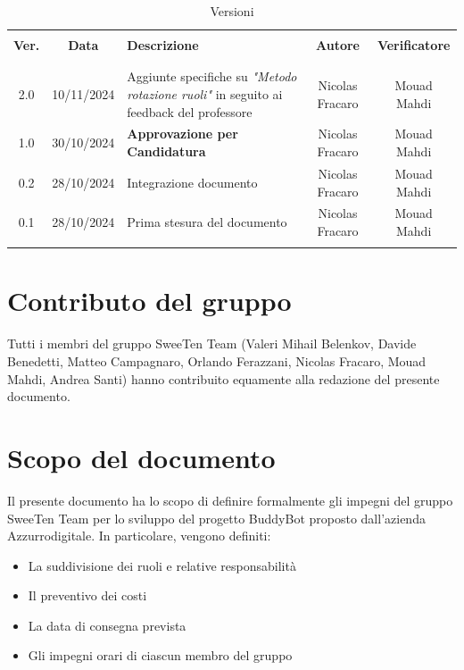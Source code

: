 \documentclass[italian, 12pt]{article}
\begin{document}
\pagestyle{mystyle}


\begin{table}[!h]
	\caption{Versioni}
	\begin{center}
		\begin{tabular}{ c c p{6.7cm} c c}
			\hline \\[-2ex]
			\textbf{Ver.} & \textbf{Data} & \textbf{Descrizione} & \textbf{Autore} & \textbf{Verificatore}  \\
			\\[-2ex] \hline \\[-1.5ex]
            2.0 & 10/11/2024 & Aggiunte specifiche su \textit{"Metodo rotazione ruoli"} in seguito ai feedback del professore & Nicolas Fracaro & Mouad Mahdi\\
            1.0 & 30/10/2024 & \textbf{Approvazione per Candidatura} & Nicolas Fracaro & Mouad Mahdi\\
			0.2 & 28/10/2024 &  Integrazione documento & Nicolas Fracaro & Mouad Mahdi\\
			0.1 & 28/10/2024 & Prima stesura del documento & Nicolas Fracaro & Mouad Mahdi\\
			\\[-1.5ex] \hline
		\end{tabular}
	\end{center}
\end{table}
\section*{Contributo del gruppo}
\noindent Tutti i membri del gruppo SweeTen Team (Valeri Mihail Belenkov, Davide Benedetti, Matteo Campagnaro, Orlando Ferazzani, Nicolas Fracaro, Mouad Mahdi, Andrea Santi) hanno contribuito equamente alla redazione del presente documento.
\newpage

\tableofcontents
\newpage


\section{Scopo del documento}
Il presente documento ha lo scopo di definire formalmente gli impegni del gruppo SweeTen Team per lo sviluppo del progetto BuddyBot proposto dall'azienda Azzurrodigitale. In particolare, vengono definiti:
\begin{itemize}
    \item La suddivisione dei ruoli e relative responsabilità
    \item Il preventivo dei costi
    \item La data di consegna prevista
    \item Gli impegni orari di ciascun membro del gruppo
\end{itemize}
\end{document}
